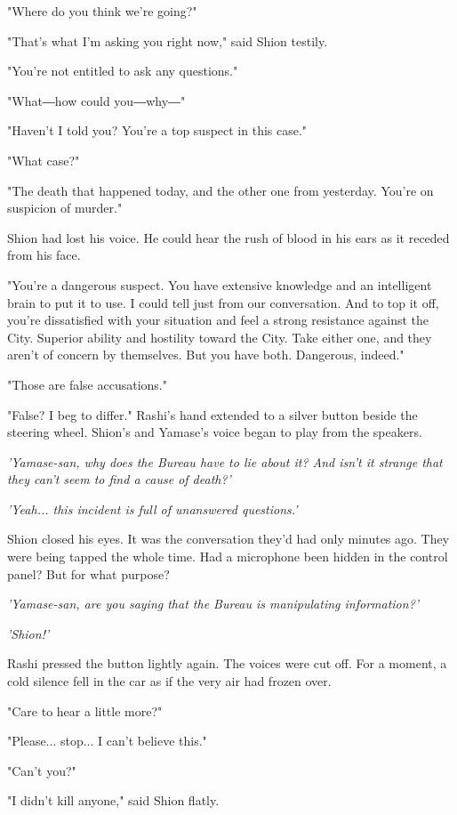 "Where do you think we're going?"

"That's what I'm asking you right now," said Shion testily.

"You're not entitled to ask any questions."

"What―how could you―why―"

"Haven't I told you? You're a top suspect in this case."

"What case?"

"The death that happened today, and the other one from yesterday. You're
on suspicion of murder."

Shion had lost his voice. He could hear the rush of blood in his ears as
it receded from his face.

"You're a dangerous suspect. You have extensive knowledge and an
intelligent brain to put it to use. I could tell just from our
conversation. And to top it off, you're dissatisfied with your situation
and feel a strong resistance against the City. Superior ability and
hostility toward the City. Take either one, and they aren't of concern
by themselves. But you have both. Dangerous, indeed."

"Those are false accusations."

"False? I beg to differ." Rashi's hand extended to a silver button
beside the steering wheel. Shion's and Yamase's voice began to play from
the speakers.

\emph{'Yamase-san, why does the Bureau have to lie about it? And isn't it
	strange that they can't seem to find a cause of death?'}

\emph{'Yeah... this incident is full of unanswered questions.'}

Shion closed his eyes. It was the conversation they'd had only minutes
ago. They were being tapped the whole time. Had a microphone been hidden
in the control panel? But for what purpose?

\emph{'Yamase-san, are you saying that the Bureau is manipulating
	information?'}

\emph{'Shion!'}

Rashi pressed the button lightly again. The voices were cut off. For a
moment, a cold silence fell in the car as if the very air had frozen
over.

"Care to hear a little more?"

"Please... stop... I can't believe this."

"Can't you?"

"I didn't kill anyone," said Shion flatly.

